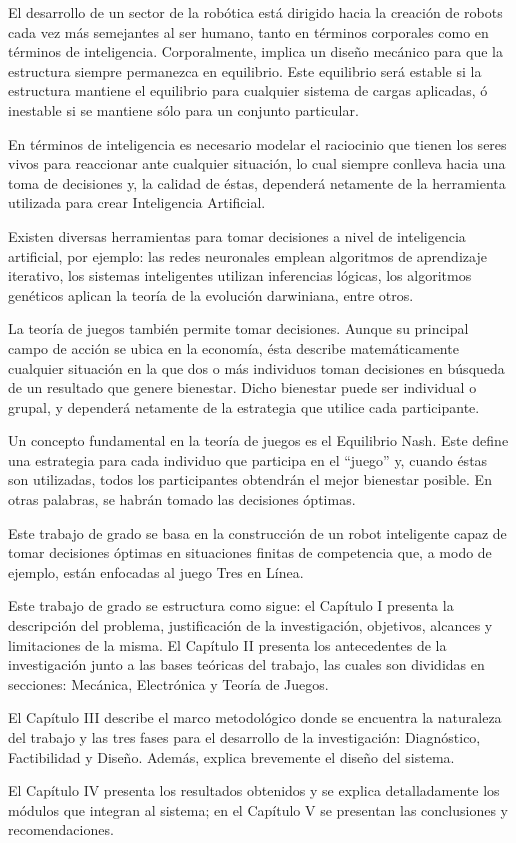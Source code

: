\introduccion

El desarrollo de un sector de la robótica está dirigido hacia la creación de 
robots cada vez más semejantes al ser humano, tanto en términos corporales como en 
términos de inteligencia. Corporalmente, implica un diseño mecánico para que la 
estructura siempre permanezca en equilibrio. Este equilibrio será estable si la 
estructura mantiene el equilibrio para cualquier sistema de cargas aplicadas, ó 
inestable si se mantiene sólo para un conjunto particular. 

En términos de inteligencia es necesario modelar el raciocinio que tienen los 
seres vivos para reaccionar ante cualquier situación, lo cual siempre conlleva hacia 
una toma de decisiones y, la calidad de éstas, dependerá netamente de la herramienta 
utilizada para crear Inteligencia Artificial. 

 Existen diversas herramientas para tomar decisiones a nivel de inteligencia 
artificial, por ejemplo: las redes neuronales emplean algoritmos de aprendizaje 
iterativo, los sistemas inteligentes utilizan inferencias lógicas, los algoritmos 
genéticos aplican la teoría de la evolución darwiniana, entre otros. 

 La teoría de juegos también permite tomar decisiones. Aunque su principal 
campo de acción se ubica en la economía, ésta describe matemáticamente cualquier 
situación en la que dos o más individuos toman decisiones en búsqueda de un 
resultado que genere bienestar. Dicho bienestar puede ser individual o grupal, y 
dependerá netamente de la estrategia que utilice cada participante.  

 Un concepto fundamental en la teoría de juegos es el Equilibrio Nash. Este 
define una estrategia para cada individuo que participa en el “juego” y, cuando éstas 
son utilizadas, todos los participantes obtendrán el mejor bienestar posible. En otras 
palabras, se habrán tomado las decisiones óptimas. 

 Este trabajo de grado se basa en la construcción de un robot inteligente capaz 
de tomar decisiones óptimas en situaciones finitas de competencia que, a modo de 
ejemplo, están enfocadas al juego Tres en Línea. 

 Este trabajo de grado se estructura como sigue: el Capítulo I presenta la 
descripción del problema, justificación de la investigación, objetivos, alcances y 
limitaciones de la misma. El Capítulo II presenta los antecedentes de la investigación 
junto a las bases teóricas del trabajo, las cuales son divididas en secciones: Mecánica, 
Electrónica y Teoría de Juegos.  

 El Capítulo III describe el marco metodológico donde se encuentra la 
naturaleza del trabajo y las tres fases para el desarrollo de la investigación: 
Diagnóstico, Factibilidad y Diseño. Además, explica brevemente el diseño del 
sistema.  

 El Capítulo IV presenta los resultados obtenidos y se explica detalladamente 
los módulos que integran al sistema; en el Capítulo V se presentan las conclusiones y 
recomendaciones. 